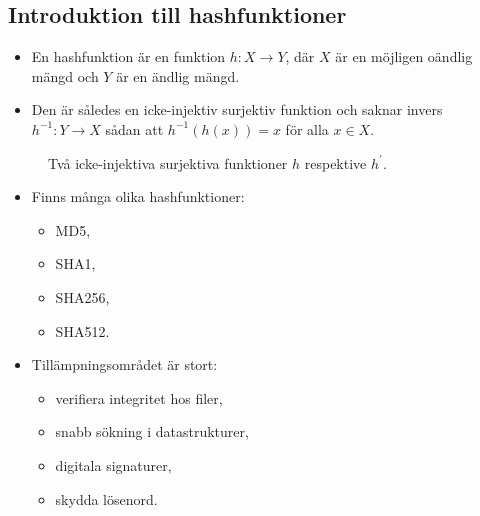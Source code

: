\documentclass{beamer}
\theoremstyle{definition}
\begin{document}
\subsection{Introduktion till hashfunktioner}
\begin{frame}{\insertsubsectionhead}
  \begin{itemize}
    \item En hashfunktion är en funktion \(h\colon X\to Y\), där \(X\) är en 
      möjligen oändlig mängd och \(Y\) är en ändlig mängd.
    \item Den är således en icke-injektiv surjektiv funktion och saknar invers 
      \(h^{-1}\colon Y\to X\) sådan att \(h^{-1}(h(x)) = x\) för alla \(x\in 
      X\).
  \end{itemize}
  \begin{figure}
    \hspace{0.1\textwidth}
    \caption{Två icke-injektiva surjektiva funktioner \(h\) respektive 
    \(h^\prime\).}
  \end{figure}
\end{frame}
\begin{frame}{\insertsubsectionhead}
  \begin{itemize}
    \item Finns många olika hashfunktioner:
      \begin{itemize}
        \item MD5,
        \item SHA1,
        \item SHA256,
        \item SHA512.
      \end{itemize}
    \item Tillämpningsområdet är stort:
      \begin{itemize}
        \item verifiera integritet hos filer,
        \item snabb sökning i datastrukturer,
        \item digitala signaturer,
        \item skydda lösenord.
      \end{itemize}
  \end{itemize}
\end{frame}
\end{document}
